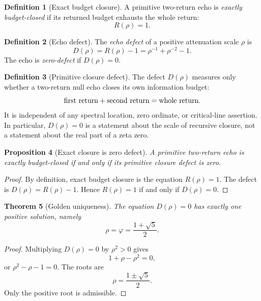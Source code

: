 \documentclass[11pt,a4paper]{article}
\theoremstyle{plain}
\newtheorem{theorem}{Theorem}[section]
\newtheorem{proposition}[theorem]{Proposition}
\theoremstyle{definition}
\newtheorem{definition}[theorem]{Definition}
\theoremstyle{remark}
\numberwithin{equation}{section}
\newcommand{\vp}{\varphi}
\begin{document}
\begin{definition}[Exact budget closure]
\label{def:exact-budget-closure}
A primitive two-return echo is \emph{exactly budget-closed} if its
returned budget exhausts the whole return:
\[
  R(\rho)=1.
\]
\end{definition}

\begin{definition}[Echo defect]
The \emph{echo defect} of a positive attenuation scale \(\rho\) is
\begin{equation}
  D(\rho)=R(\rho)-1=\rho^{-1}+\rho^{-2}-1.
  \label{eq:defect}
\end{equation}
The echo is \emph{zero-defect} if \(D(\rho)=0\).
\end{definition}

\begin{definition}[Primitive closure defect]
\label{def:primitive-closure-defect}
The defect \(D(\rho)\) measures only whether a two-return null echo
closes its own information budget:
\[
  \hbox{first return}+\hbox{second return}=\hbox{whole return}.
\]
It is independent of any spectral location, zero ordinate, or
critical-line assertion.  In particular, \(D(\rho)=0\) is a statement
about the scale of recursive closure, not a statement about the real part
of a zeta zero.
\end{definition}

\begin{proposition}[Exact closure is zero defect]
\label{prop:exact-closure-zero-defect}
A primitive two-return echo is exactly budget-closed if and only if its
primitive closure defect is zero.
\end{proposition}

\begin{proof}
By definition, exact budget closure is the equation \(R(\rho)=1\).  The
defect is \(D(\rho)=R(\rho)-1\).  Hence \(R(\rho)=1\) if and only if
\(D(\rho)=0\).
\end{proof}

\medskip
\begin{theorem}[Golden uniqueness]
\label{thm:golden-uniqueness}
The equation \(D(\rho)=0\) has exactly one positive solution, namely
\[
  \rho=\vp=\frac{1+\sqrt5}{2}.
\]
\end{theorem}

\begin{proof}
Multiplying \(D(\rho)=0\) by \(\rho^2>0\) gives
\[
  1+\rho-\rho^2=0,
\]
or \(\rho^2-\rho-1=0\).  The roots are
\[
  \rho=\frac{1\pm\sqrt5}{2}.
\]
Only the positive root is admissible.
\end{proof}
\end{document}
